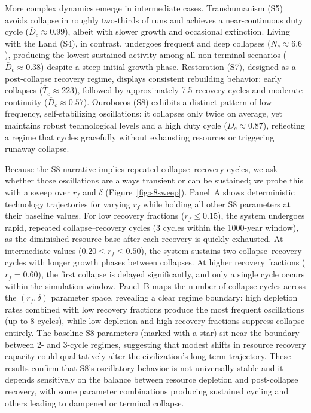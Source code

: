 More complex dynamics emerge in intermediate cases. Transhumanism (S5) avoids collapse in roughly two-thirds of runs and achieves a near-continuous duty cycle (\(\overline{D}_c \approx 0.99\)), albeit with slower growth and occasional extinction. Living with the Land (S4), in contrast, undergoes frequent and deep collapses (\(\overline{N}_c \approx 6.6\)), producing the lowest sustained activity among all non-terminal scenarios (\(\overline{D}_c \approx 0.38\)) despite a steep initial growth phase. Restoration (S7), designed as a post-collapse recovery regime, displays consistent rebuilding behavior: early collapses (\(\overline{T}_c \approx 223\)), followed by approximately 7.5 recovery cycles and moderate continuity (\(\overline{D}_c \approx 0.57\)). Ouroboros (S8) exhibits a distinct pattern of low-frequency, self-stabilizing oscillations: it collapses only twice on average, yet maintains robust technological levels and a high duty cycle (\(\overline{D}_c \approx 0.87\)), reflecting a regime that cycles gracefully without exhausting resources or triggering runaway collapse.

Because the S8 narrative implies repeated collapse--recovery cycles, we ask whether those oscillations are always transient or can be sustained; we probe this with a sweep over $r_f$ and $\delta$ (Figure~\ref{fig:s8sweep}). Panel~A shows deterministic technology trajectories for varying $r_f$ while holding all other S8 parameters at their baseline values. For low recovery fractions ($r_f \leq 0.15$), the system undergoes rapid, repeated collapse--recovery cycles (3 cycles within the 1000-year window), as the diminished resource base after each recovery is quickly exhausted. At intermediate values ($0.20 \leq r_f \leq 0.50$), the system sustains two collapse--recovery cycles with longer growth phases between collapses. At higher recovery fractions ($r_f = 0.60$), the first collapse is delayed significantly, and only a single cycle occurs within the simulation window. Panel~B maps the number of collapse cycles across the $(r_f, \delta)$ parameter space, revealing a clear regime boundary: high depletion rates combined with low recovery fractions produce the most frequent oscillations (up to 8 cycles), while low depletion and high recovery fractions suppress collapse entirely. The baseline S8 parameters (marked with a star) sit near the boundary between 2- and 3-cycle regimes, suggesting that modest shifts in resource recovery capacity could qualitatively alter the civilization's long-term trajectory. These results confirm that S8's oscillatory behavior is not universally stable and it depends sensitively on the balance between resource depletion and post-collapse recovery, with some parameter combinations producing sustained cycling and others leading to dampened or terminal collapse.

